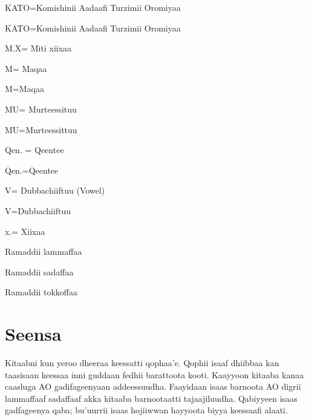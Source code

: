 \documentclass[11pt,b5paper]{book}
\begin{document}
\begin{description}
  \item KATO=Komishinii Aadaafi Turzimii Oromiyaa
  \item KATO=Komishinii Aadaafi Turzimii Oromiyaa 
  \item M.X= Miti xiixaa 
  \item M= Maqaa 
  \item M=Maqaa
  \item MU= Murteessituu 
  \item MU=Murteessittuu
  \item Qen. = Qeentee 
  \item Qen.=Qeentee
  \item V= Dubbachiiftuu (Vowel) 
  \item V=Dubbachiiftuu
  \item x.= Xiixaa 
  \item[2]Ramaddii lammaffaa
  \item[3]Ramaddii sadaffaa
  \item[1]Ramaddii tokkoffaa
\end{description}

\chapter{Seensa}
\setlength{\parindent}{3em}

Kitaabni kun yeroo dheeraa keessatti qophaa’e. Qophii isaaf dhiibbaa kan taasisaan keessaa inni guddaan fedhii barattoota kooti. Kaayyoon kitaaba kanaa caasluga AO gadifageenyaan
addeessuudha. Faayidaan isaas barnoota AO digrii lammaffaaf sadaffaaf akka kitaaba barnootaatti tajaajiluudha. Qabiyyeen isaas gadfageenya qaba; bu’uurrii isaas hojiiwwan hayyoota
biyya keessaafi alaati.
\end{document}
